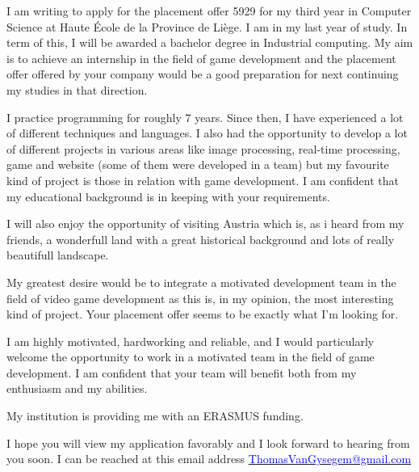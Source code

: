 \documentclass[10pt,stdletter,dateno]{newlfm}
\begin{document}
\begin{newlfm}

I am writing to apply for the placement offer 5929 for my third year in Computer Science
at \og Haute \'Ecole de la Province de Li\`ege\fg. I am in my last year of study.
In term of this, I will be awarded a bachelor degree in Industrial computing. My aim is to achieve an internship 
in the field of game development and the placement offer offered by your company would be 
a good preparation for next continuing my studies in that direction.

I practice programming for roughly 7 years. Since then,
I have experienced a lot of different techniques and languages. I also had the opportunity to develop a lot
of different projects in various areas like image processing, real-time processing,
game and website (some of them were developed in a team) but my favourite kind of project is those in relation with game development. 
I am confident that my educational background is in keeping with your requirements.

I will also enjoy the opportunity of visiting Austria which is, as i heard from my friends, 
a wonderfull land with a great historical background and lots of really beautifull landscape.

My greatest desire would be to integrate a motivated development team in the field of video game development as 
this is, in my opinion, the most interesting kind of project. Your placement offer seems to be exactly what I'm looking for.

I am highly motivated, hardworking and reliable, and I would particularly
welcome the opportunity to work in a motivated team in the field of game development.
I am confident that your team will benefit both from my enthusiasm and my abilities.

My institution is providing me with an ERASMUS funding.

I hope you will view my application favorably and I look forward to hearing from you soon.
I can be reached at this email address \href{mailto:thomasvangysegem@gmail.com}{\textcolor{blue}{ThomasVanGysegem@gmail.com}}

\end{newlfm}
\end{document}
